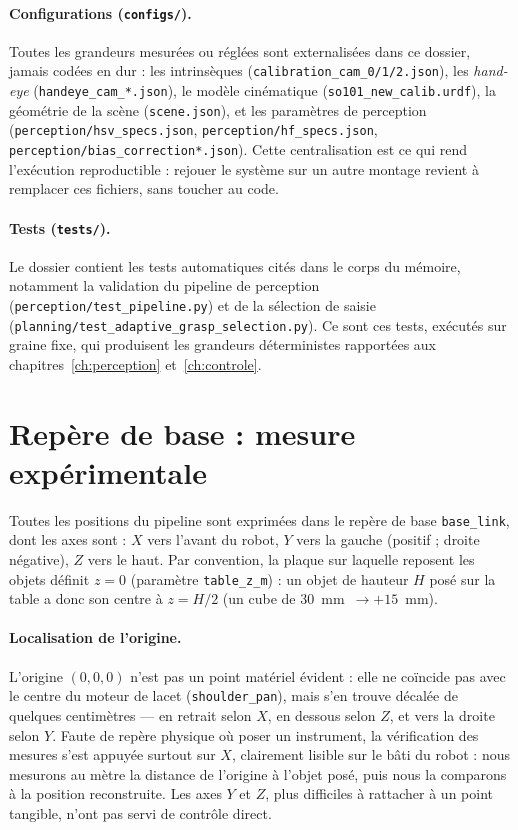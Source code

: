 \paragraph{Configurations (\texttt{configs/}).} Toutes les grandeurs mesurées ou réglées sont externalisées dans ce dossier, jamais codées en dur : les intrinsèques (\texttt{calibration\_cam\_0/1/2.json}), les \emph{hand-eye} (\texttt{handeye\_cam\_*.json}), le modèle cinématique (\texttt{so101\_new\_calib.urdf}), la géométrie de la scène (\texttt{scene.json}), et les paramètres de perception (\texttt{perception/hsv\_specs.json}, \texttt{perception/hf\_specs.json}, \texttt{perception/bias\_correction*.json}). Cette centralisation est ce qui rend l'exécution reproductible : rejouer le système sur un autre montage revient à remplacer ces fichiers, sans toucher au code.

\paragraph{Tests (\texttt{tests/}).} Le dossier contient les tests automatiques cités dans le corps du mémoire, notamment la validation du pipeline de perception (\texttt{perception/test\_pipeline.py}) et de la sélection de saisie (\texttt{planning/test\_adaptive\_grasp\_selection.py}). Ce sont ces tests, exécutés sur graine fixe, qui produisent les grandeurs déterministes rapportées aux chapitres~\ref{ch:perception} et~\ref{ch:controle}.

\section{Repère de base : mesure expérimentale}
\label{sec:ann-repere}

Toutes les positions du pipeline sont exprimées dans le repère de base \texttt{base\_link}, dont les axes sont : $X$ vers l'avant du robot, $Y$ vers la gauche (positif ; droite négative), $Z$ vers le haut. Par convention, la plaque sur laquelle reposent les objets définit $z=0$ (paramètre \texttt{table\_z\_m}) : un objet de hauteur $H$ posé sur la table a donc son centre à $z=H/2$ (un cube de 30~mm~$\rightarrow +15$~mm).

\paragraph{Localisation de l'origine.} L'origine $(0,0,0)$ n'est pas un point matériel évident : elle ne coïncide pas avec le centre du moteur de lacet (\texttt{shoulder\_pan}), mais s'en trouve décalée de quelques centimètres --- en retrait selon $X$, en dessous selon $Z$, et vers la droite selon $Y$. Faute de repère physique où poser un instrument, la vérification des mesures s'est appuyée surtout sur $X$, clairement lisible sur le bâti du robot : nous mesurons au mètre la distance de l'origine à l'objet posé, puis nous la comparons à la position reconstruite. Les axes $Y$ et $Z$, plus difficiles à rattacher à un point tangible, n'ont pas servi de contrôle direct.

